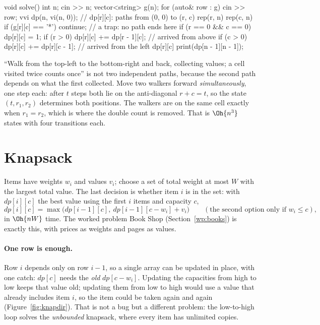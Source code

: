 {\begin{code}
void solve() {
    int n;
    cin >> n;
    vector<string> g(n);
    for (auto& row : g) cin >> row;
    vvi dp(n, vi(n, 0));  // dp[r][c]: paths from (0, 0) to (r, c)
    rep(r, n) rep(c, n) {
        if (g[r][c] == '*') continue;  // a trap: no path ends here
        if (r == 0 && c == 0) dp[r][c] = 1;
        if (r > 0) dp[r][c] += dp[r - 1][c];  // arrived from above
        if (c > 0) dp[r][c] += dp[r][c - 1];  // arrived from the left
        dp[r][c] %
    }
    print(dp[n - 1][n - 1]);
}
\end{code}

\begin{trick}
``Walk from the top-left to the bottom-right and back, collecting values; a cell visited twice counts once'' is not two independent
paths, because the second path depends on what the first collected. Move two walkers forward \emph{simultaneously}, one step each:
after $t$ steps both lie on the anti-diagonal $r + c = t$, so the state $(t, r_1, r_2)$ determines both positions. The walkers are on
the same cell exactly when $r_1 = r_2$, which is where the double count is removed. That is $\Oh{n^3}$ states with four transitions
each.
\end{trick}

\section[Knapsack]{Knapsack \hfill \gold}\label{sec:knapsack}

Items have weights $w_i$ and values $v_i$; choose a set of total weight at most $W$ with the largest total value. The last decision
is whether item $i$ is in the set: with $dp[i][c]$ the best value using the first $i$ items and capacity $c$,
\[
  dp[i][c] = \max\bigl(dp[i-1][c],\ dp[i-1][c - w_i] + v_i\bigr) \qquad (\text{the second option only if } w_i \le c),
\]
in $\Oh{nW}$ time. The worked problem Book Shop (Section~\ref{wp:books}) is exactly this, with prices as weights and pages as values.

\paragraph{One row is enough.} Row $i$ depends only on row $i - 1$, so a single array can be updated in place, with one catch:
$dp[c]$ needs the \emph{old} $dp[c - w_i]$. Updating the capacities from high to low keeps that value old; updating them from low to
high would use a value that already includes item $i$, so the item could be taken again and again (Figure~\ref{fig:knapdir}). That is
not a bug but a different problem: the low-to-high loop solves the \emph{unbounded} knapsack, where every item has unlimited copies.

}
